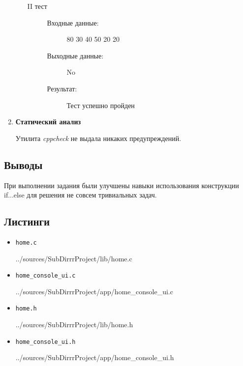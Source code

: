 \documentclass[12pt,a4paper]{report}
\begin{document}
\begin{enumerate}
\begin{enumerate}
\begin{description}
\item[II тест]
\hspace{\parindent}
\begin{flushleft}
\begin{description}
\item[Входные данные:] 80 30 40 50 20 20 
\item[Выходные данные:] No
\item[Результат:] Тест успешно пройден
\end{description}
\end{flushleft}
\end{description}
\end{enumerate}
\item \textbf{Статический анализ}

\hspace{\parindent} 
Утилита \textit{cppcheck} не выдала никаких предупреждений.
\end{enumerate}



\subsection{Выводы}
\hspace{\parindent} 
При выполнении задания были улучшены навыки использования конструкции if...else для решения не совсем тривиальных задач.

\subsection*{Листинги}
\begin{itemize}
\item[] \verb-home.c-

{../sources/SubDirrrProject/lib/home.c}
\item[] \verb-home_console_ui.c-

{../sources/SubDirrrProject/app/home_console_ui.c}
\item[] \verb-home.h-

{../sources/SubDirrrProject/lib/home.h}
\item[] \verb-home_console_ui.h-

{../sources/SubDirrrProject/app/home_console_ui.h}
\end{itemize}
%
\end{document}
